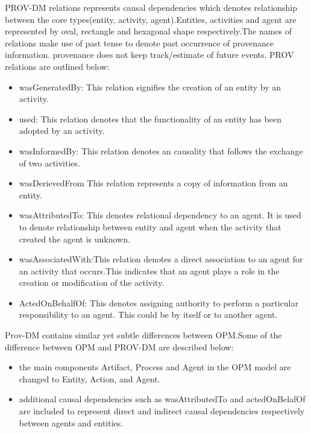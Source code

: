 PROV-DM relations represents causal dependencies which denotes relationship between the core types(entity, activity, agent).Entities, activities and agent are represented by oval, rectangle and hexagonal shape respectively.The names of relations make use of past tense to denote past occurrence of provenance information. provenance does not keep track/estimate of future events. PROV relations are outlined below:


\begin{itemize}
\item wasGeneratedBy: This relation signifies the creation of an entity by an activity. 

\item used: This relation denotes that the functionality of an entity has been adopted by an activity.

\item wasInformedBy: This relation denotes an causality that follows the exchange of two activities.

\item wasDerievedFrom This relation represents a copy of information from an entity. 

\item wasAttributedTo: This denotes relational dependency to an agent. It is used to denote relationship between entity and agent when the activity that created the agent is unknown.

\item wasAssociatedWith:This relation denotes a direct association to an agent for an activity that occurs.This indicates that an agent plays a role in the creation or modification of the activity.

\item ActedOnBehalfOf: This denotes assigning authority to perform a particular responsibility to an agent. This could be by itself or to another agent.



\end{itemize}

Prov-DM contains similar yet subtle differences between OPM.Some of the difference between OPM and PROV-DM are described below:

\begin{itemize}

\item the main components Artifact, Process and Agent in the OPM model are changed to Entity, Action, and Agent. 

\item additional causal dependencies such as wasAttributedTo and actedOnBelafOf are included to represent direct and indirect causal dependencies respectively between agents and entities.

\end{itemize}

